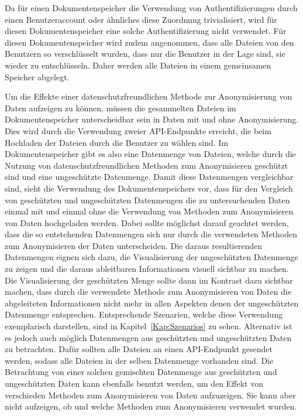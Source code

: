 \documentclass[
    fontsize=12pt,
    headings=small,
    parskip=half,           %
    bibliography=totoc,
    numbers=noenddot,       %
    open=any,               %
    ]{scrreprt}
\begin{document}
Da für einen Dokumentenspeicher die Verwendung von Authentifizierungen durch einen Benutzeraccount oder ähnliches diese Zuordnung trivialisiert, wird für diesen Dokumentenspeicher eine solche Authentifizierung nicht verwendet.
Für diesen Dokumentenspeicher wird zudem angenommen, dass alle Dateien von den Benutzern so verschlüsselt wurden, dass nur die Benutzer in der Lage sind, sie wieder zu entschlüsseln.
Daher werden alle Dateien in einem gemeinsamen Speicher abgelegt.

Um die Effekte einer datenschutzfreundlichen Methode zur Anonymisierung von Daten aufzeigen zu können, müssen die gesammelten Dateien im Dokumentenspeicher unterscheidbar sein in Daten mit und ohne Anonymisierung. 
Dies wird durch die Verwendung zweier API-Endpunkte erreicht, die beim Hochladen der Dateien durch die Benutzer zu wählen sind.
Im Dokumentenspeicher gibt es also eine Datenmenge von Dateien, welche durch die Nutzung von datenschutzfreundlichen Methoden zum Anonymisieren geschützt sind und eine ungeschützte Datenmenge.
Damit diese Datenmengen vergleichbar sind, sieht die Verwendung des Dokumentenspeichers vor, dass für den Vergleich von geschützten und ungeschützten Datenmengen die zu untersuchenden Daten einmal mit und einmal ohne die Verwendung von Methoden zum Anonymisieren von Daten hochgeladen werden. 
Dabei sollte möglichst darauf geachtet werden, dass die so entstehenden Datenmengen sich nur durch die verwendeten Methoden zum Anonymisieren der Daten unterscheiden. 
Die daraus resultierenden Datenmengen eignen sich dazu, die Visualisierung der ungeschützten Datenmenge zu zeigen und die daraus ableitbaren Informationen visuell sichtbar zu machen.
Die Visualisierung der geschützten Menge sollte dann im Kontrast dazu sichtbar machen, dass durch die verwendete Methode zum Anonymisieren von Daten die abgeleiteten Informationen nicht mehr in allen Aspekten denen der ungeschützten Datenmenge entsprechen.
Entsprechende Szenarien, welche diese Verwendung exemplarisch darstellen, sind in Kapitel~\ref{Kap:Szenarios} zu sehen.
Alternativ ist es jedoch auch möglich Datenmengen aus geschützten und ungeschützten Daten zu betrachten.
Dafür sollten alle Dateien an einen API-Endpunkt gesendet werden, sodass alle Dateien in der selben Datenmenge vorhanden sind.
Die Betrachtung von einer solchen gemischten Datenmenge aus geschützten und ungeschützten Daten kann ebenfalls benutzt werden, um den Effekt von verschieden Methoden zum Anonymisieren von Daten aufzuzeigen.
Sie kann aber nicht aufzeigen, ob und welche Methoden zum Anonymisieren verwendet wurden.%
\end{document}

